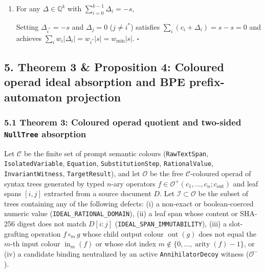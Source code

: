 \documentclass[
  11pt,
]{article}
\newcommand{\passthrough}[1]{#1}
\providecommand{\tightlist}{%
  \setlength{\itemsep}{0pt}\setlength{\parskip}{0pt}}
\newcommand{\PfpDisplayMath}[1]{%
  \sbox{\PfpMathBox}{$\displaystyle #1$}%
  \ifdim\wd\PfpMathBox>\linewidth
    \resizebox{\linewidth}{!}{\usebox{\PfpMathBox}}%
  \else\usebox{\PfpMathBox}\fi}
\begin{document}
\begin{enumerate}
\def\labelenumi{(\arabic{enumi})}
\setcounter{enumi}{1}
\tightlist
\item
  For any \(\Delta \in \mathbb{Q}^k\) with
  \(\sum_{i=0}^{k-1} \Delta_i = -s\),
  \begin{center}\PfpDisplayMath{\sum_{i=0}^{k-1} w_i |\Delta_i| \ge w_{\min} \sum_{i=0}^{k-1} |\Delta_i| \ge w_{\min} \left|\sum_{i=0}^{k-1} \Delta_i\right| = w_{\min} |s|.}\end{center}
  Setting \(\Delta_{i^*} = -s\) and \(\Delta_j = 0\) (\(j \ne i^*\))
  satisfies \(\sum_i (c_i + \Delta_i) = s - s = 0\) and achieves
  \(\sum_i w_i |\Delta_i| = w_{i^*} |s| = w_{\min} |s|\). \(\square\)
\end{enumerate}

\subsection{5. Theorem 3 \& Proposition 4: Coloured operad ideal
absorption and BPE prefix-automaton
projection}\label{theorem-3-proposition-4-coloured-operad-ideal-absorption-and-bpe-prefix-automaton-projection}

\subsubsection{\texorpdfstring{5.1 Theorem 3: Coloured operad quotient
and two-sided \texttt{NullTree}
absorption}{5.1 Theorem 3: Coloured operad quotient and two-sided NullTree absorption}}\label{theorem-3-coloured-operad-quotient-and-two-sided-nulltree-absorption}

Let \(\mathcal{C}\) be the finite set of prompt semantic colours
(\passthrough{\lstinline!RawTextSpan!}, \nolinkurl{IsolatedVariable},
\passthrough{\lstinline!Equation!}, \nolinkurl{SubstitutionStep},
\nolinkurl{RationalValue}, \nolinkurl{InvariantWitness},
\passthrough{\lstinline!TargetResult!}), and let \(\mathcal{O}\) be the
free \(\mathcal{C}\)-coloured operad of syntax trees generated by typed
\(n\)-ary operators
\(f \in \mathcal{O}^+(c_1,\allowbreak  \dots,\allowbreak  c_n; c_{\text{out}})\)
and leaf spans \([i,\allowbreak  j]\) extracted from a source document
\(D\). Let \(\mathcal{I} \subset \mathcal{O}\) be the subset of trees
containing any of the following defects: (i) a non-exact or
boolean-coerced numeric value (\nolinkurl{IDEAL_RATIONAL_DOMAIN}), (ii)
a leaf span whose content or SHA-256 digest does not match \(D[i:j]\)
(\nolinkurl{IDEAL_SPAN_IMMUTABILITY}), (iii) a slot-grafting operation
\(f \circ_m g\) whose child output colour \(\operatorname{out}(g)\) does
not equal the \(m\)-th input colour \(\operatorname{in}_m(f)\) or whose
slot index
\(m \notin \{0,\allowbreak  \dots,\allowbreak  \operatorname{arity}(f)-1\}\),
or (iv) a candidate binding neutralized by an active
\nolinkurl{AnnihilatorDecoy} witness (\(\mathcal{O}^-\)).
\end{document}
